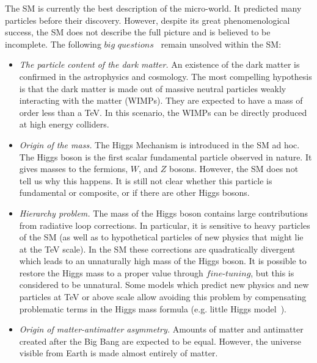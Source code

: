 The SM is currently the best description of the micro-world. It predicted many particles before their discovery. However, despite its great phenomenological success, the SM does not describe the full picture and is believed to be incomplete. The following $big$ $questions$~\cite{Gershtein:2013iqa} remain unsolved within the SM:
\begin{itemize}
\item \textit{The particle content of the dark matter.} An existence of the dark matter is confirmed in the astrophysics and cosmology. The most compelling hypothesis is that the dark matter is made out of massive neutral particles weakly interacting with the matter (WIMPs). They are expected to have a mass of order less than a TeV. In this scenario, the WIMPs can be directly produced at high energy colliders.
\item \textit{Origin of the mass.} The Higgs Mechanism is introduced in the SM ad hoc. The Higgs boson is the first scalar fundamental particle observed in nature. It gives masses to the fermions, $W$, and $Z$ bosons. However, the SM does not tell us why this happens. It is still not clear whether this particle is fundamental or composite, or if there are other Higgs bosons.
\item \textit{Hierarchy problem.} The mass of the Higgs boson contains large contributions from radiative loop corrections. In particular, it is sensitive to heavy particles of the SM (as well as to hypothetical particles of new physics that might lie at the TeV scale). 
In the SM these corrections are quadratically divergent which leads to an unnaturally high mass of the Higgs boson. It is possible to restore the Higgs mass to a proper value through $fine$-$tuning$, but this is considered to be unnatural. Some models which predict new physics and new particles at TeV or above scale allow avoiding this problem
by compensating problematic terms in the Higgs mass formula (e.g. little Higgs model~\cite{Brak}).
\item \textit{Origin of matter-antimatter asymmetry.} Amounts of matter and antimatter created after the Big Bang are expected to be equal. However, the universe visible from Earth is made almost entirely of matter.

\end{itemize}

